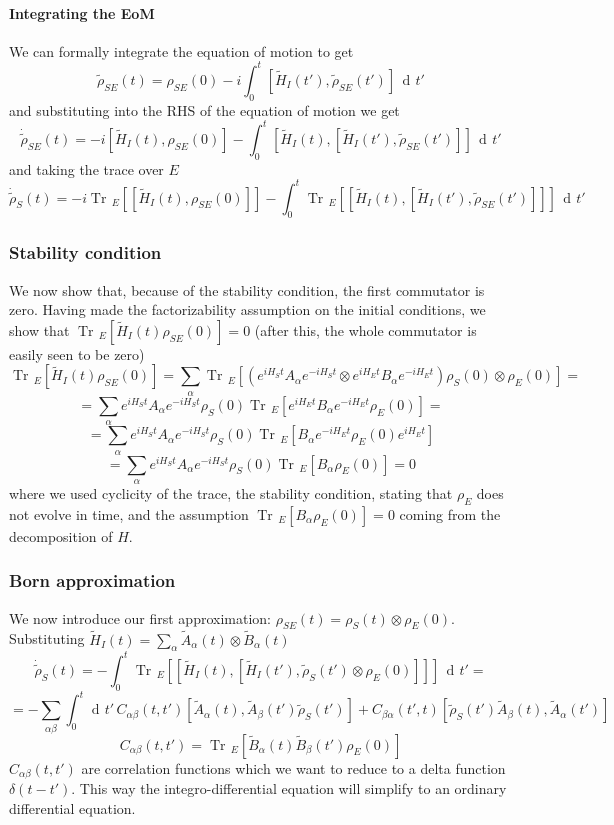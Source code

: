 \documentclass[a4paper, 11pt]{article}
\newcommand{\dd}{\mathop{\mathrm{d}\!}{}}
\newcommand{\Tr}{\mathop{\mathrm{Tr}\!}{}}
\begin{document}
	\paragraph{Integrating the EoM}
	We can formally integrate the equation of motion to get
	\[ \tilde{\rho}_{SE}(t) = \rho_{SE}(0) - i \int_{0}^{t} [\tilde{H}_I(t'), \tilde{\rho}_{SE}(t')]\,\dd t' \]
	and substituting into the RHS of the equation of motion we get
	\[ \dot{\tilde{\rho}}_{SE}(t) = -i[\tilde{H}_I(t), \rho_{SE}(0)] - \int_{0}^{t} \left[\tilde{H}_I(t), [\tilde{H}_I(t'), \tilde{\rho}_{SE}(t')]\right]\,\dd t' \]
	and taking the trace over $E$
	\[ \dot{\tilde{\rho}}_S(t) = -i \Tr_E\left[[\tilde{H}_I(t), \rho_{SE}(0)]\right] - \int_{0}^{t} \Tr_E\left[\left[\tilde{H}_I(t), [\tilde{H}_I(t'), \tilde{\rho}_{SE}(t')]\right]\right]\,\dd t' \]
	
	\subsubsection{Stability condition} We now show that, because of the stability condition, the first commutator is zero. Having made the factorizability assumption on the initial conditions, we show that $\Tr_E\left[\tilde{H}_I(t) \rho_{SE}(0)\right]=0$ (after this, the whole commutator is easily seen to be zero)
	\[ \Tr_E\left[\tilde{H}_I(t) \rho_{SE}(0)\right] = \sum_\alpha \Tr_E\left[ \left( e^{iH_S t}A_\alpha e^{-iH_S t} \otimes
	e^{iH_E t}B_\alpha e^{-iH_E t} \right) \rho_S(0)\otimes \rho_E(0) \right] = \]
	\[ = \sum_\alpha e^{iH_S t}A_\alpha e^{-iH_S t} \rho_S(0) \Tr_E\left[	e^{iH_E t}B_\alpha e^{-iH_E t} \rho_E(0) \right] = \]
	\[ = \sum_\alpha e^{iH_S t}A_\alpha e^{-iH_S t} \rho_S(0) \Tr_E\left[ B_\alpha e^{-iH_E t} \rho_E(0) e^{iH_E t} \right] \]
	\[ = \sum_\alpha e^{iH_S t}A_\alpha e^{-iH_S t} \rho_S(0) \Tr_E\left[ B_\alpha \rho_E(0) \right] = 0 \]
	where we used cyclicity of the trace, the stability condition, stating that $\rho_E$ does not evolve in time, and the assumption $\Tr_E[B_\alpha \rho_E(0)]=0$ coming from the decomposition of $H$.
	
	\subsubsection{Born approximation}
	We now introduce our first approximation: $\rho_{SE}(t) = \rho_S(t) \otimes \rho_E(0)$.
	Substituting $\tilde{H}_I(t) = \sum_\alpha \tilde{A}_\alpha(t) \otimes \tilde{B}_\alpha(t)$
	\[ \dot{\tilde{\rho}}_S(t) = -\int_{0}^{t} \Tr_E\left[ \left[\tilde{H}_I(t), [\tilde{H}_I(t'), \tilde{\rho}_S(t')\otimes \rho_E(0)]\right] \right]\, \dd t' = \]
	\[ = -\sum_{\alpha\beta} \int_{0}^{t} \dd t'\, C_{\alpha\beta}(t,t') [\tilde{A}_\alpha(t), \tilde{A}_\beta(t')\tilde{\rho}_S(t')] +
	C_{\beta\alpha}(t',t) [\tilde{\rho}_S(t')\tilde{A}_\beta(t), \tilde{A}_\alpha(t')] \]
	\[ C_{\alpha\beta}(t,t') = \Tr_E\left[ \tilde{B}_\alpha(t)\tilde{B}_\beta(t') \rho_E(0) \right] \]
	$C_{\alpha\beta}(t,t')$ are correlation functions which we want to reduce to a delta function $\delta(t-t')$. This way the integro-differential equation will simplify to an ordinary differential equation.
	
\end{document}
